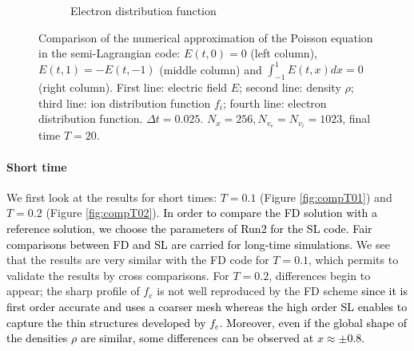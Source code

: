 \documentclass{article}
\numberwithin{equation}{section}
\begin{document}
\begin{figure}
\begin{subfigure}{\textwidth}
		\caption{Electron distribution function}
	\end{subfigure}
	\caption{Comparison of the numerical approximation of the Poisson equation in the semi-Lagrangian code: $E(t,0)=0$ (left column), $E(t,1)=-E(t,-1)$ (middle column) and $\int_{-1}^1E(t,x)dx=0$ (right column). First line: electric field $E$; second line: density $\rho$; 
	third line: ion distribution function $f_i$; fourth line: electron distribution function. 
		 $\Delta t=0.025$. $N_x=256, N_{v_e}=N_{v_i}=1023$, final time $T=20$. }
	\label{fig:comp_E0_intE0}
\end{figure}  

\paragraph{Short time}

We first look at the results for short times: $T=0.1$ (Figure \ref{fig:compT01}) and $T=0.2$ (Figure \ref{fig:compT02}). 
\textcolor{black}{In order to compare the FD solution with a reference solution, we choose the parameters of Run2 for the SL code. Fair comparisons between FD and SL are carried for long-time simulations.}
We see that the results are very similar with the FD code for $T=0.1$, which permits to validate the results by cross comparisons. For $T=0.2$, differences begin to appear; the sharp profile of $f_e$ is not well reproduced by the FD scheme  \textcolor{black}{since it 
is first order accurate and uses a coarser mesh whereas the high order SL enables to capture the thin structures developed by $f_e$. 
Moreover, even if the global shape of the densities $\rho$ are similar, some differences can be observed at $x\approx \pm 0.8$. }  

\end{document}
